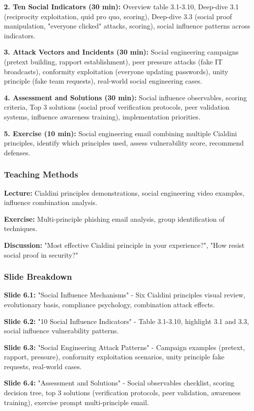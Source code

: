 \documentclass[11pt,a4paper]{article}
\begin{document}
\textbf{2. Ten Social Indicators (30 min):} Overview table 3.1-3.10, Deep-dive 3.1 (reciprocity exploitation, quid pro quo, scoring), Deep-dive 3.3 (social proof manipulation, "everyone clicked" attacks, scoring), social influence patterns across indicators.

\textbf{3. Attack Vectors and Incidents (30 min):} Social engineering campaigns (pretext building, rapport establishment), peer pressure attacks (fake IT broadcasts), conformity exploitation (everyone updating passwords), unity principle (fake team requests), real-world social engineering cases.

\textbf{4. Assessment and Solutions (30 min):} Social influence observables, scoring criteria, Top 3 solutions (social proof verification protocols, peer validation systems, influence awareness training), implementation priorities.

\textbf{5. Exercise (10 min):} Social engineering email combining multiple Cialdini principles, identify which principles used, assess vulnerability score, recommend defenses.

\subsubsection{Teaching Methods}
\textbf{Lecture:} Cialdini principles demonstrations, social engineering video examples, influence combination analysis.

\textbf{Exercise:} Multi-principle phishing email analysis, group identification of techniques.

\textbf{Discussion:} "Most effective Cialdini principle in your experience?", "How resist social proof in security?"

\subsubsection{Slide Breakdown}
\textbf{Slide 6.1:} "Social Influence Mechanisms" - Six Cialdini principles visual review, evolutionary basis, compliance psychology, combination attack effects.

\textbf{Slide 6.2:} "10 Social Influence Indicators" - Table 3.1-3.10, highlight 3.1 and 3.3, social influence vulnerability patterns.

\textbf{Slide 6.3:} "Social Engineering Attack Patterns" - Campaign examples (pretext, rapport, pressure), conformity exploitation scenarios, unity principle fake requests, real-world cases.

\textbf{Slide 6.4:} "Assessment and Solutions" - Social observables checklist, scoring decision tree, top 3 solutions (verification protocols, peer validation, awareness training), exercise prompt multi-principle email.
\end{document}

